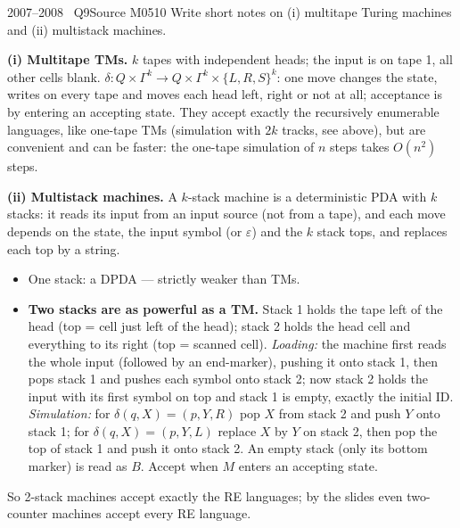 \documentclass[11pt,a4paper]{article}
\newcommand{\eps}{\varepsilon}
\begin{document}
\begin{question}{2007--2008 \textbullet\ Q9}{Source M05}{10}
Write short notes on (i) multitape Turing machines and (ii) multistack machines.
\end{question}
\begin{solution}
\textbf{(i) Multitape TMs.} $k$ tapes with independent heads; the input is on tape 1, all other cells blank. $\delta:Q\times\Gamma^k\to Q\times\Gamma^k\times\{L,R,S\}^k$: one move changes the state, writes on every tape and moves each head left, right or not at all; acceptance is by entering an accepting state. They accept exactly the recursively enumerable languages, like one-tape TMs (simulation with $2k$ tracks, see above), but are convenient and can be faster: the one-tape simulation of $n$ steps takes $O(n^2)$ steps.

\textbf{(ii) Multistack machines.} A $k$-stack machine is a deterministic PDA with $k$ stacks: it reads its input from an input source (not from a tape), and each move depends on the state, the input symbol (or $\eps$) and the $k$ stack tops, and replaces each top by a string.
\begin{itemize}
\item One stack: a DPDA --- strictly weaker than TMs.
\item \textbf{Two stacks are as powerful as a TM.} Stack 1 holds the tape left of the head (top = cell just left of the head); stack 2 holds the head cell and everything to its right (top = scanned cell). \emph{Loading:} the machine first reads the whole input (followed by an end-marker), pushing it onto stack 1, then pops stack 1 and pushes each symbol onto stack 2; now stack 2 holds the input with its first symbol on top and stack 1 is empty, exactly the initial ID. \emph{Simulation:} for $\delta(q,X)=(p,Y,R)$ pop $X$ from stack 2 and push $Y$ onto stack 1; for $\delta(q,X)=(p,Y,L)$ replace $X$ by $Y$ on stack 2, then pop the top of stack 1 and push it onto stack 2. An empty stack (only its bottom marker) is read as $B$. Accept when $M$ enters an accepting state.
\end{itemize}
So 2-stack machines accept exactly the RE languages; by the slides even two-counter machines accept every RE language.
\end{solution}
\end{document}
